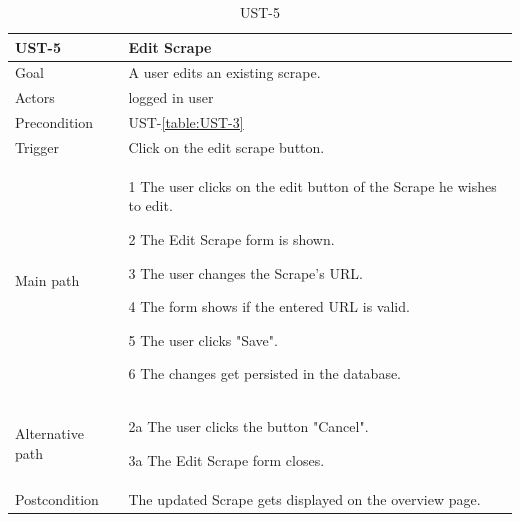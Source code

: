 \documentclass[titlepage, 12pt]{article}
\newenvironment{packed_itemize}{
  \vspace{-\topsep}
  \begin{itemize}
    \setlength{\itemsep}{1pt}
    \setlength{\parskip}{0pt}
    \setlength{\parsep}{0pt}
  }{\end{itemize}}
\begin{document}
\begin{table}[H]
  \begin{center}

    \begin{tabular}{p{4cm}|p{10cm}}
      \textbf{UST-5}   & \textbf{Edit Scrape}                                    \\
      \hline
      Goal             & A user edits an existing scrape.                        \\
      \hline
      Actors           & logged in user                                          \\
      \hline
      Precondition     & UST-\ref{table:UST-3}                                   \\
      \hline
      Trigger          & Click on the edit scrape button.                        \\
      \hline
      Main path        &
      \begin{packed_itemize}
        \item [1] The user clicks on the edit button of the Scrape he wishes to edit.
        \item [2] The Edit Scrape form is shown.
        \item [3] The user changes the Scrape's URL.
        \item [4] The form shows if the entered URL is valid.
        \item [5] The user clicks "Save".
        \item [6] The changes get persisted in the database.
      \end{packed_itemize}                                                 \\
      \hline
      Alternative path &
      \begin{packed_itemize}
        \item [2a] The user clicks the button "Cancel".
        \item [3a] The Edit Scrape form closes.
      \end{packed_itemize}                                                 \\
      \hline
      Postcondition    & The updated Scrape gets displayed on the overview page. \\
    \end{tabular}

    \vspace{-2mm}
    \caption{UST-5}
    \label{table:UST-5}

  \end{center}
\end{table}
\end{document}
